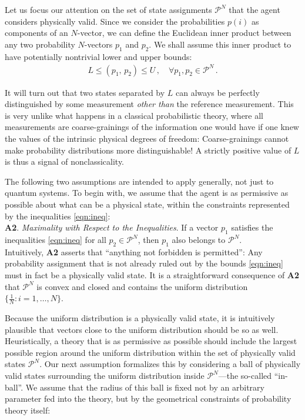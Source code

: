 \documentclass[%
 reprint,superscriptaddress,
 amsmath,amssymb,
 aps,pra, onecolumn, 12pt
]{revtex4-2}
\newcommand{\eqn}[1]{\begin{eqnarray} #1 \end{eqnarray}}
\newcommand{\tit}[1]{\textit{#1}}
\begin{document}
Let us focus our attention on the set of state assignments $\mathcal{P}^N$ that the agent considers physically valid. Since we consider the probabilities $p(i)$ as components of an $N$-vector, we can define the Euclidean inner product between any two probability $N$-vectors $p_1$ and $p_2$.  We shall assume this inner product to have potentially nontrivial lower and upper bounds:
\eqn{ \label{eqn:ineq}
L \leq (p_1, \, p_2) \leq U \, , \quad \forall p_1,p_2 \in \mathcal{P}^N \, .
}

It will turn out that two states separated by $L$ can always be perfectly distinguished by some measurement \tit{other than} the reference measurement. This is very unlike what happens in a classical probabilistic theory, where all measurements are coarse-grainings of the information one would have if one knew the values of the intrinsic physical degrees of freedom:  Coarse-grainings cannot make probability distributions more distinguishable! A strictly positive value of $L$ is thus a signal of nonclassicality.

The following two assumptions are intended to apply generally, not just to quantum systems. To begin with, we assume that the agent is as permissive as possible about what can be a physical state, within the constraints represented by the inequalities \eqref{eqn:ineq}:\\

{\bf A2}. \tit{Maximality with Respect to the Inequalities}. If a vector $p_1$ satisfies the inequalities \eqref{eqn:ineq} for all $p_2 \in \mathcal{P}^N$, then $p_1 $ also belongs to $\mathcal{P}^N$.\\

Intuitively, {\bf A2} asserts that ``anything not forbidden is permitted'': Any probability assignment that is not already ruled out by the bounds \eqref{eqn:ineq} must in fact be a physically valid state. It is a straightforward consequence of {\bf A2} that $\mathcal{P}^N$ is convex and closed and contains the uniform distribution $\{\frac{1}{N} : i=1,\dots,N\}$.

Because the uniform distribution is a physically valid state, it is intuitively plausible that vectors close to the uniform distribution should be so as well. Heuristically, a theory that is as permissive as possible should include the largest possible region around the uniform distribution within the set of physically valid states $\mathcal{P}^N$. Our next assumption formalizes this by considering a ball of physically valid states surrounding the uniform distribution inside $\mathcal{P}^N$---the so-called ``in-ball''. We assume that the radius of this ball is fixed not by an arbitrary parameter fed into the theory, but by the geometrical constraints of probability theory itself:\\
\end{document}
